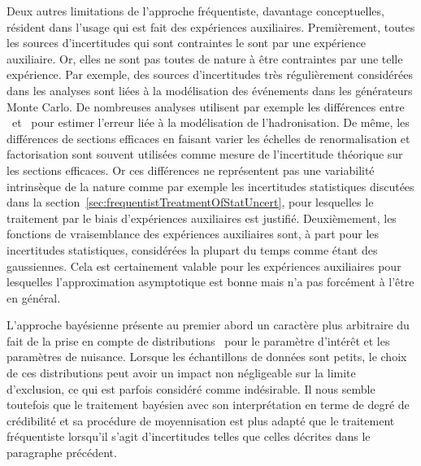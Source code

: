 Deux autres limitations de l'approche fr\'equentiste, davantage conceptuelles, r\'esident dans l'usage qui est fait des exp\'eriences auxiliaires. Premi\`erement, toutes les sources d'incertitudes qui sont contraintes le sont par une exp\'erience auxiliaire. Or, elles ne sont pas toutes de nature \`a \^etre contraintes par une telle exp\'erience. Par exemple, des sources d'incertitudes tr\`es r\'eguli\`erement consid\'er\'ees dans les analyses sont li\'ees \`a la mod\'elisation des \'ev\'enements dans les g\'en\'erateurs Monte Carlo. De nombreuses analyses utilisent par exemple les diff\'erences entre \pythia~et \herwig~pour estimer l'erreur li\'ee \`a la mod\'elisation de l'hadronisation. De m\^eme, les diff\'erences de sections efficaces en faisant varier les \'echelles de renormalisation et factorisation sont souvent utilis\'ees comme mesure de l'incertitude th\'eorique sur les sections efficaces. Or ces diff\'erences ne repr\'esentent pas une variabilit\'e intrins\`eque de la nature comme par exemple les incertitudes statistiques discut\'ees dans la section~\ref{sec:frequentistTreatmentOfStatUncert}, pour lesquelles le traitement par le biais d'exp\'eriences auxiliaires est justifi\'e. Deuxi\`emement, les fonctions de vraisemblance des exp\'eriences auxiliaires sont, \`a part pour les incertitudes statistiques, consid\'er\'ees la plupart du temps comme \'etant des gaussiennes. Cela est certainement valable pour les exp\'eriences auxiliaires pour lesquelles l'approximation asymptotique est bonne mais n'a pas forc\'ement \`a l'\^etre en g\'en\'eral.

L'approche bay\'esienne pr\'esente au premier abord un caract\`ere plus arbitraire du fait de la prise en compte de distributions \prior~pour le param\`etre d'int\'er\^et et les param\`etres de nuisance. Lorsque les \'echantillons de donn\'ees sont petits, le choix de ces distributions 
peut avoir un impact non n\'egligeable sur la limite d'exclusion, ce qui est parfois consid\'er\'e comme ind\'esirable. 
Il nous semble toutefois que le traitement bay\'esien avec son interpr\'etation en terme de degr\'e de cr\'edibilit\'e et sa proc\'edure de moyennisation est plus adapt\'e que le traitement fr\'equentiste lorsqu'il s'agit d'incertitudes telles que celles d\'ecrites dans le paragraphe pr\'ec\'edent.

